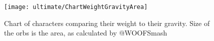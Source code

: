 \begin{figure}[ht]
	\texttt{[image: ultimate/ChartWeightGravityArea]}
	\caption{Chart of characters comparing their weight to their gravity. Size of the orbs is the area, as calculated by @WOOFSmash}
\end{figure}

